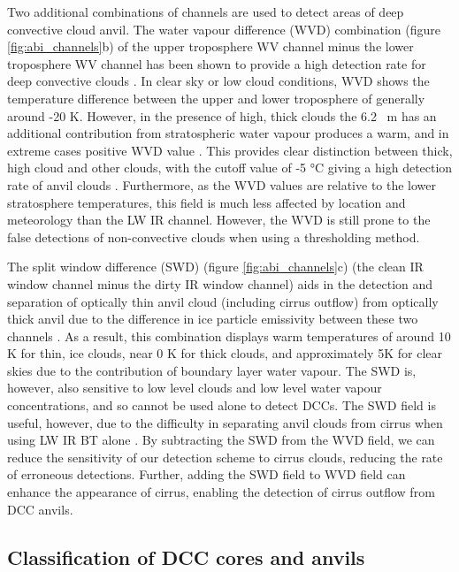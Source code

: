 Two additional combinations of channels are used to detect areas of deep convective cloud anvil. 
The water vapour difference (WVD) combination (figure \ref{fig:abi_channels}b) of the upper troposphere WV channel minus the lower troposphere WV channel has been shown to provide a high detection rate for deep convective clouds \citep{muller_role_2018, muller_novel_2019}.
In clear sky or low cloud conditions, WVD shows the temperature difference between the upper and lower troposphere of generally around -20 K. 
However, in the presence of high, thick clouds the 6.2 \unit{\mu m} has an additional contribution from stratospheric water vapour produces a warm, and in extreme cases positive WVD value \citep{schmetz_monitoring_1997}.
This provides clear distinction between thick, high cloud and other clouds, with the cutoff value of -5 °C giving a high detection rate of anvil clouds \citep{muller_novel_2019}. 
Furthermore, as the WVD values are relative to the lower stratosphere temperatures, this field is much less affected by location and meteorology than the LW IR channel.
However, the WVD is still prone to the false detections of non-convective clouds when using a thresholding method.

The split window difference (SWD) (figure \ref{fig:abi_channels}c) (the clean IR window channel minus the dirty IR window channel) aids in the detection and separation of optically thin anvil cloud (including cirrus outflow) from optically thick anvil due to the difference in ice particle emissivity between these two channels \citep{heidinger_gazing_2009}.
As a result, this combination displays warm temperatures of around 10 \unit{K} for thin, ice clouds, near 0 \unit{K} for thick clouds, and approximately 5\unit{K} for clear skies due to the contribution of boundary layer water vapour.
The SWD is, however, also sensitive to low level clouds and low level water vapour concentrations, and so cannot be used alone to detect DCCs.
The SWD field is useful, however, due to the difficulty in separating anvil clouds from cirrus when using LW IR BT alone \citep{hong_detection_2005}. 
By subtracting the SWD from the WVD field, we can reduce the sensitivity of our detection scheme to cirrus clouds, reducing the rate of erroneous detections.
Further, adding the SWD field to WVD field can enhance the appearance of cirrus, enabling the detection of cirrus outflow  from DCC anvils.

\subsection{Classification of DCC cores and anvils}

